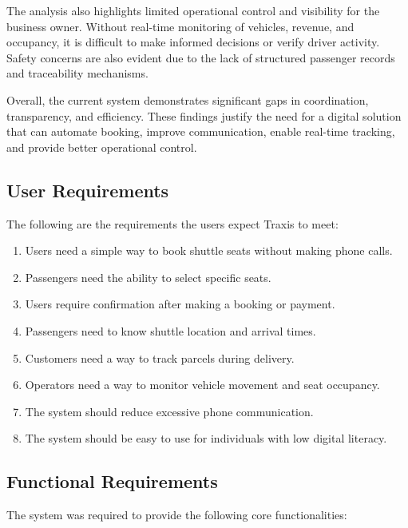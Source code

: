 The analysis also highlights limited operational control and visibility for the
business owner. Without real-time monitoring of vehicles, revenue, and
occupancy, it is difficult to make informed decisions or verify driver activity.
Safety concerns are also evident due to the lack of structured passenger records
and traceability mechanisms.



Overall, the current system demonstrates significant gaps in coordination,
transparency, and efficiency. These findings justify the need for a digital
solution that can automate booking, improve communication, enable real-time
tracking, and provide better operational control.



\subsection{User Requirements}

The following are the requirements the users expect Traxis to meet:



\begin{enumerate}
 \item Users need a simple way to book shuttle seats without making phone
calls.

 \item Passengers need the ability to select specific seats.
 \item Users require confirmation after making a booking or payment.
 \item Passengers need to know shuttle location and arrival times.
 \item Customers need a way to track parcels during delivery.
 \item Operators need a way to monitor vehicle movement and seat
occupancy.

 \item The system should reduce excessive phone communication.
 \item The system should be easy to use for individuals with low digital
literacy.

\end{enumerate}

\subsection{Functional Requirements}

The system was required to provide the following core functionalities:



